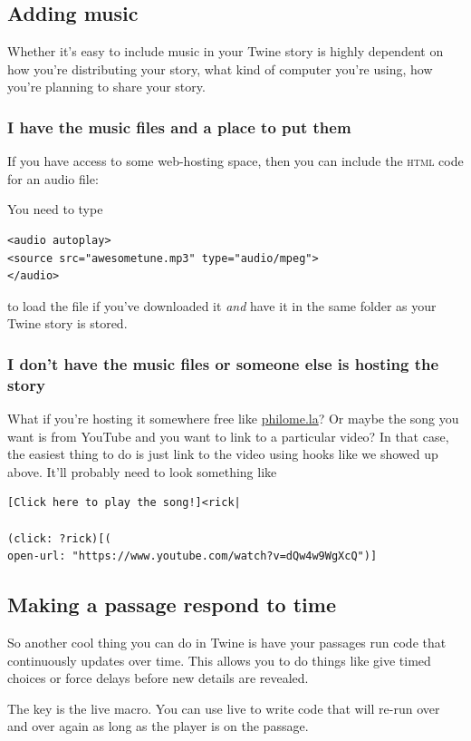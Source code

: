 \documentclass[a5paper,11pt]{article}
\begin{document}
\subsection{Adding music}
Whether it's easy to include music in your Twine story is highly dependent on how you're distributing your story, what kind of computer you're using, how you're planning to share your story.

\subsubsection{I have the music files and a place to put them}
If you have access to some web-hosting space, then you can include the \textsc{html} code for an audio file:

You need to type
\begin{verbatim}
<audio autoplay>
<source src="awesometune.mp3" type="audio/mpeg">
</audio>
\end{verbatim}

to load the file if you've downloaded it \emph{and} have it in the same folder as your Twine story is stored.

\subsubsection{I don't have the music files or someone else is hosting the story}
What if you're hosting it somewhere free like \url{philome.la}? Or maybe the song you want is from YouTube and you want to link to a particular video? In that case, the easiest thing to do is just link to the video using hooks like we showed up above. It'll probably need to look something like
\begin{verbatim}
[Click here to play the song!]<rick|

(click: ?rick)[(
open-url: "https://www.youtube.com/watch?v=dQw4w9WgXcQ")]
\end{verbatim}

\subsection{Making a passage respond to time}
So another cool thing you can do in Twine is have your passages run code that continuously updates over time. This allows you to do things like give timed choices or force delays before new details are revealed.

The key is the live macro. You can use live to write code that will re-run over and over again as long as the player is on the passage.
\end{document}
